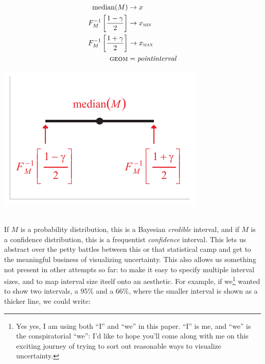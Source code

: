 \documentclass[journal]{vgtc}                     %
\newcommand{\equationfigure}[2]{%
\noindent
\begin{minipage}{.5\columnwidth}
\setlength{\abovedisplayskip}{0pt}
\setlength{\belowdisplayskip}{0pt}
#1\end{minipage}%
\begin{minipage}{.4\columnwidth}\centering #2 \end{minipage}%
\vspace{.5\belowdisplayskip}\\
}
\begin{document}
\equationfigure{
\begin{align*}
\operatorname{median}(M) &\rightarrow x\\
F_M^{-1}\left[\frac{1 - \gamma}{2}\right] &\rightarrow x_\textsc{min}\\
F_M^{-1}\left[\frac{1 + \gamma}{2}\right] &\rightarrow x_\textsc{max}\\
\textsc{geom} &= \mathit{pointinterval}
\end{align*}
}{\includegraphics[width=1.2\columnwidth]{figs/3-geom_pointinterval_quantiles.pdf}}
If $M$ is a probability distribution, this is a Bayesian \textit{credible }interval, and if $M$ is a confidence distribution, this is a frequentist \textit{confidence} interval. This lets us abstract over the petty battles between this or that statistical camp and get to the meaningful business of visualizing uncertainty. This also allows us something not present in other attempts so far: to make it easy to specify multiple interval sizes, and to map interval size itself onto an aesthetic. For example, if we\footnote{Yes yes, I am using both ``I'' and ``we'' in this paper. ``I'' is me, and ``we'' is the conspiratorial ``we'': I'd like to hope you'll come along with me on this exciting journey of trying to sort out reasonable ways to visualize uncertainty.} wanted to show two intervals, a 95\% and a 66\%, where the smaller interval is shown as a thicker line, we could write:
\end{document}
